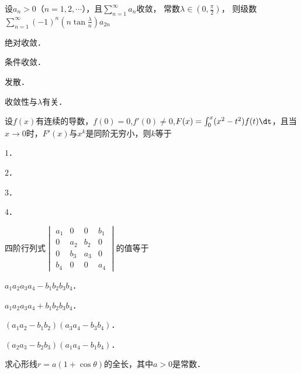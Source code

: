 \documentclass[plain,noanswer,medmath]{../../template/jnuexam}
\begin{document}
\begin{problem}
设$a_n > 0$（$n = 1,2, \cdots$），且$\sum_{n = 1}^{\infty}a_n$收敛，
常数$\lambda \in \left(0,\frac{\pi}{2} \right)$，
则级数$\sum_{n = 1}^{\infty}(- 1)^n\left(n\tan \frac{\lambda}{n} \right) a_{2n}$\pickout{}
\begin{abcd}
\item 绝对收敛．   
\item 条件收敛．   
\item 发散．   
\item 收敛性与$\lambda$有关．
\end{abcd}
\end{problem}


\begin{problem}
设$f(x)$有连续的导数，$f(0) = 0$,$f'(0) \ne 0$,$F(x) = \int_0^x (x^2 - t^2)f(t)\dt$，且当$x \to 0$时，$F'(x)$与$x^k$是同阶无穷小，则$k$等于\pickout{}
\begin{abcd}
\item $1$．          
\item $2$．          
\item $3$．          
\item $4$．
\end{abcd}
\end{problem}


\begin{problem}
四阶行列式$\begin{vmatrix}
  a_1 &   0 &   0 & b_1 \\
    0 & a_2 & b_2 & 0 \\
    0 & b_3 & a_3 & 0 \\
  b_4 &   0 &   0 & a_4
\end{vmatrix}$的值等于\pickout{}
\begin{abcd}
\item $a_1a_2a_3a_4 - b_1b_2b_3b_4$．					
\item $a_1a_2a_3a_4 + b_1b_2b_3b_4$．
\item $(a_1a_2 - b_1b_2)(a_3a_4 - b_3b_4)$．			
\item $(a_2a_3 - b_2b_3)(a_1a_4 - b_1b_4)$．
\end{abcd}
\end{problem}




\begin{problem}
求心形线$r = a(1 + \cos \theta)$的全长，其中$a > 0$是常数．
\end{problem}
\end{document}
